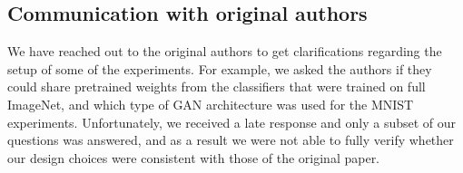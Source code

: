 \subsection{Communication with original authors}
We have reached out to the original authors to get clarifications regarding the setup of some of the experiments. For example, we asked the authors if they could share pretrained weights from the classifiers that were trained on full ImageNet, and which type of GAN architecture was used for the MNIST experiments. Unfortunately, we received a late response and only a subset of our questions was answered, and as a result we were not able to fully verify whether our design choices were consistent with those of the original paper.

